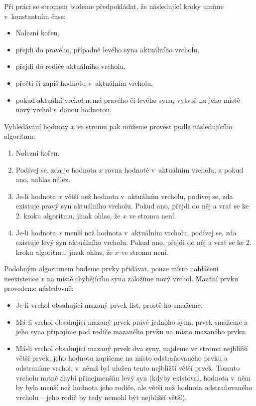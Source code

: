 Při práci se stromem budeme předpokládat, že následující kroky umíme v~konstantním čase:
\begin{itemize}
\item Nalezni kořen,
\item přejdi do pravého, případně levého syna aktuálního vrcholu,
\item přejdi do rodiče aktuálního vrcholu,
\item přečti či zapiš hodnotu v~aktuálním vrcholu,
\item pokud aktuální vrchol nemá pravého či levého syna, vytvoř na jeho místě nový vrchol s~danou hodnotou.
\end{itemize}
Vyhledávání hodnoty $x$ ve stromu pak můžeme provést podle následujícího algoritmu:
\begin{enumerate}
\item Nalezni kořen.
\item Podívej se, zda je hodnota $x$ rovna hodnotě v~aktuálním vrcholu, a pokud ano, nahlas nález.
\item Je-li hodnota $x$ větší než hodnota v~aktuálním vrcholu, podívej se, zda existuje pravý syn aktuálního vrcholu. Pokud ano, přejdi do něj a vrať se ke 2. kroku algoritmu, jinak ohlas, že  $x$ ve stromu není.
\item Je-li hodnota $x$ menší než hodnota v~aktuálním vrcholu, podívej se, zda existuje levý syn aktuálního vrcholu. Pokud ano, přejdi do něj a vrať se ke 2. kroku algoritmu, jinak ohlas, že  $x$ ve stromu není.
\end{enumerate}

Podobným algoritmem budeme prvky přidávat, pouze místo nahlášení neexistence $x$ na místě chybějícího syna založíme nový vrchol. Mazání prvku provedeme následovně:

\begin{itemize}
\item Je-li vrchol obsahující mazaný prvek list, prostě ho smažeme.
\item Má-li vrchol obsahující mazaný prvek právě jednoho syna, prvek smažeme a jeho syna připojíme pod rodiče mazaného prvku na místo mazaného prvku.
\item Má-li vrchol obsahující mazaný prvek dva syny, najdeme ve stromu nejblížší větší prvek, jeho
hodnotu zapíšeme na místo odstraňovaného prvku a odstraníme vrchol, v~němž byl uložen tento nejbližší větší
prvek. Tomuto vrcholu nutně chybí přinejmenším levý syn (kdyby existoval, hodnota
v~něm by byla menší než hodnota jeho rodiče, ale větší než hodnota odstraňovaného
vrcholu -- jeho rodič by tedy nemohl být nejbližší větší).  
\end{itemize} 

